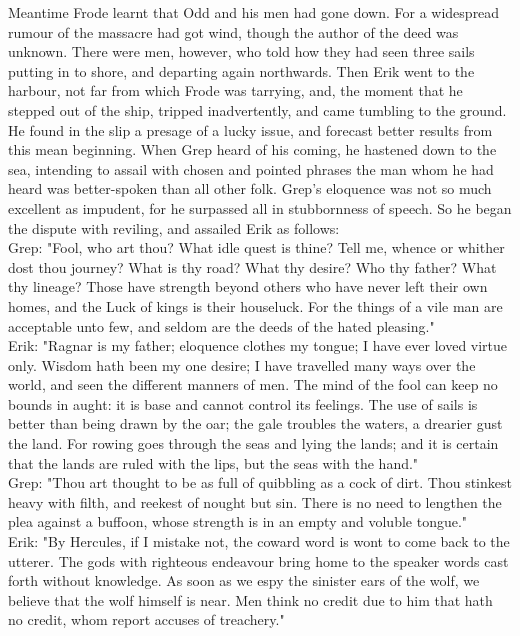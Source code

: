 \documentclass[10pt,a4paper]{report}
\begin{document}
Meantime Frode learnt that Odd and his men had gone down. For a widespread rumour of the massacre had got wind, though the author of the deed was unknown. There were men, however, who told how they had seen three sails putting in to shore, and departing again northwards. Then Erik went to the harbour, not far from which Frode was tarrying, and, the moment that he stepped out of the ship, tripped inadvertently, and came tumbling to the ground. He found in the slip a presage of a lucky issue, and forecast better results from this mean beginning. When Grep heard of his coming, he hastened down to the sea, intending to assail with chosen and pointed phrases the man whom he had heard was better-spoken than all other folk. Grep's eloquence was not so much excellent as impudent, for he surpassed all in stubbornness of speech. So he began the dispute with reviling, and assailed Erik as follows:\\

Grep: "Fool, who art thou? What idle quest is thine? Tell me, whence or whither dost thou journey? What is thy road? What thy desire? Who thy father? What thy lineage? Those have strength beyond others who have never left their own homes, and the Luck of kings is their houseluck. For the things of a vile man are acceptable unto few, and seldom are the deeds of the hated pleasing."\\

Erik: "Ragnar is my father; eloquence clothes my tongue; I have ever loved virtue only. Wisdom hath been my one desire; I have travelled many ways over the world, and seen the different manners of men. The mind of the fool can keep no bounds in aught: it is base and cannot control its feelings. The use of sails is better than being drawn by the oar; the gale troubles the waters, a drearier gust the land. For rowing goes through the seas and lying the lands; and it is certain that the lands are ruled with the lips, but the seas with the hand."\\

Grep: "Thou art thought to be as full of quibbling as a cock of dirt. Thou stinkest heavy with filth, and reekest of nought but sin. There is no need to lengthen the plea against a buffoon, whose strength is in an empty and voluble tongue."\\

Erik: "By Hercules, if I mistake not, the coward word is wont to come back to the utterer. The gods with righteous endeavour bring home to the speaker words cast forth without knowledge. As soon as we espy the sinister ears of the wolf, we believe that the wolf himself is near. Men think no credit due to him that hath no credit, whom report accuses of treachery."\\
\end{document}
